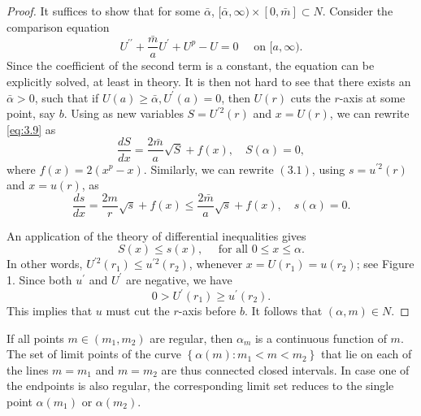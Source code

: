 \begin{proof}
  It suffices to show that for some $\bar{\alpha}$,
  $[\bar{\alpha}, \infty) \times[0, \bar{m}] \subset N$. Consider the comparison equation
  \begin{equation}\label{eq:3.9}
  U^{\prime \prime}+\frac{\bar{m}}{a} U^{\prime}+U^p-U=0 \quad \text { on }[a, \infty) .
  \end{equation}
  Since the coefficient of the second term is a constant, the equation can be explicitly
  solved, at least in theory. It is then not hard to see that there exists an $\bar{\alpha}>0$, 
  such that if $U(a) \geq \bar{\alpha}, U^{\prime}(a)=0$, then $U(r)$ cuts the $r$-axis at 
  some point, say $b$.
  Using as new variables $S=U^{\prime 2}(r)$ and $x=U(r)$, we can rewrite \eqref{eq:3.9} as
  \begin{equation}\label{eq:3.10}
    \frac{d S}{d x}=\frac{2 \bar{m}}{a} \sqrt{S}+f(x), \quad S(\alpha)=0,
  \end{equation}
  where $f(x)=2\left(x^p-x\right)$. Similarly, we can rewrite $(3.1)$,
  using $s=u^{\prime 2}(r)$ and $x=u(r)$, as
  \begin{equation}\label{eq:3.11}
    \frac{d s}{d x}=\frac{2 m}{r} \sqrt{s}+f(x)
      \leq \frac{2 \bar{m}}{a} \sqrt{s}+f(x), \quad s(\alpha)=0.
  \end{equation}

  An application of the theory of differential inequalities gives
  \begin{equation}\label{eq:3.12}
    S(x) \leq s(x), \quad \text { for all } 0 \leq x \leq \alpha.    
  \end{equation}
  In other words, $U^{\prime 2}\left(r_1\right) \leq u^{\prime 2}\left(r_2\right)$, 
  whenever $x=U\left(r_1\right)=u\left(r_2\right)$; see Figure 1.
  Since both $u^{\prime}$ and $U^{\prime}$ are negative, we have
  \begin{equation}\label{eq:3.13}
    0>U^{\prime}\left(r_1\right) \geq u^{\prime}\left(r_2\right).    
  \end{equation}
  This implies that $u$ must cut the $r$-axis before $b$. It follows that $(\alpha, m) \in N$.
\end{proof}

\begin{lemma}\label{lemma:16}
  If all points $m \in\left(m_1, m_2\right)$ are regular, then $\alpha_m$ is a continuous
  function of $m$. The set of limit points of the curve $\left\{\alpha(m): m_1<m<m_2\right\}$
  that lie on each of the lines $m=m_1$ and $m=m_2$ are thus connected closed intervals.
  In case one of the endpoints is also regular, the corresponding limit set reduces to the
  single point $\alpha\left(m_1\right)$ or $\alpha\left(m_2\right)$.
\end{lemma}

